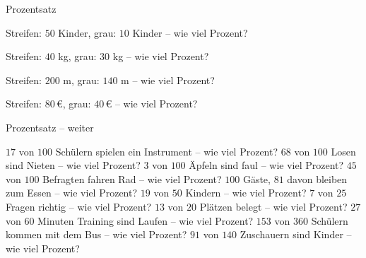 \setcounter{aufgabe}{4}

\begin{aufgabe}{Prozentsatz}
\begin{teile}
\teil Streifen: $50$ Kinder, grau: $10$ Kinder – wie viel Prozent?

\teil Streifen: $40$ kg, grau: $30$ kg – wie viel Prozent?

\teil Streifen: $200$ m, grau: $140$ m – wie viel Prozent?

\teil Streifen: $80\,€$, grau: $40\,€$ – wie viel Prozent?

\end{teile}
\end{aufgabe}

\begin{aufgabe}{Prozentsatz – weiter}
\begin{teile}
\teil $17$ von $100$ Schülern spielen ein Instrument – wie viel Prozent? \leerfeld[\%]
\teil $68$ von $100$ Losen sind Nieten – wie viel Prozent? \leerfeld[\%]
\teil $3$ von $100$ Äpfeln sind faul – wie viel Prozent? \leerfeld[\%]
\teil $45$ von $100$ Befragten fahren Rad – wie viel Prozent? \leerfeld[\%]
\teil $100$ Gäste, $81$ davon bleiben zum Essen – wie viel Prozent? \leerfeld[\%]
\teil $19$ von $50$ Kindern – wie viel Prozent? \leerfeld[\%]
\teil $7$ von $25$ Fragen richtig – wie viel Prozent? \leerfeld[\%]
\teil $13$ von $20$ Plätzen belegt – wie viel Prozent? \leerfeld[\%]
\teil $27$ von $60$ Minuten Training sind Laufen – wie viel Prozent? \leerfeld[\%]
\teil $153$ von $360$ Schülern kommen mit dem Bus – wie viel Prozent? \leerfeld[\%]
\teil $91$ von $140$ Zuschauern sind Kinder – wie viel Prozent? \leerfeld[\%]
\end{teile}
\end{aufgabe}

